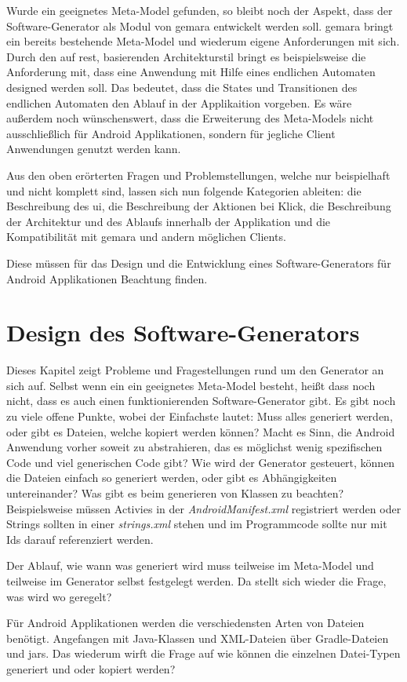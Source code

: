 Wurde ein geeignetes Meta-Model gefunden, so bleibt noch der Aspekt, dass der Software-Generator als Modul von \acf{gemara} entwickelt werden soll. \acs{gemara} bringt ein bereits bestehende Meta-Model und wiederum eigene Anforderungen mit sich. Durch den auf \acf{rest}, basierenden Architekturstil bringt es beispielsweise die Anforderung mit, dass eine Anwendung mit Hilfe eines endlichen Automaten designed werden soll. Das bedeutet, dass die States und Transitionen des endlichen Automaten den Ablauf in der Applikaition vorgeben.
Es wäre außerdem noch wünschenswert, dass die Erweiterung des Meta-Models nicht ausschließlich für Android Applikationen, sondern für jegliche Client Anwendungen genutzt werden kann.

Aus den oben erörterten Fragen und Problemstellungen, welche nur beispielhaft und nicht komplett sind, lassen sich nun folgende Kategorien ableiten: die Beschreibung des \acl{ui}, die Beschreibung der Aktionen bei Klick, die Beschreibung der Architektur und des Ablaufs innerhalb der Applikation und die Kompatibilität mit \acs{gemara} und andern möglichen Clients. 

Diese müssen für das Design und die Entwicklung eines Software-Generators für Android Applikationen Beachtung finden.

\section{Design des Software-Generators}

Dieses Kapitel zeigt Probleme und Fragestellungen rund um den Generator an sich auf. Selbst wenn ein ein geeignetes Meta-Model besteht, heißt dass noch nicht, dass es auch einen funktionierenden Software-Generator gibt. Es gibt noch zu viele offene Punkte, wobei der Einfachste lautet: Muss alles generiert werden, oder gibt es Dateien, welche kopiert werden können? Macht es Sinn, die Android Anwendung vorher soweit zu abstrahieren, das es möglichst wenig spezifischen Code und viel generischen Code gibt? Wie wird der Generator gesteuert, können die Dateien einfach so generiert werden, oder gibt es Abhängigkeiten untereinander? Was gibt es beim generieren von Klassen zu beachten? Beispielsweise müssen Activies in der \textit{AndroidManifest.xml} registriert werden oder Strings sollten in einer \textit{strings.xml} stehen und im Programmcode sollte nur mit Ids darauf referenziert werden.

Der Ablauf, wie wann was generiert wird muss teilweise im Meta-Model und teilweise im Generator selbst festgelegt werden. Da stellt sich wieder die Frage, was wird wo geregelt? 

Für Android Applikationen werden die verschiedensten Arten von Dateien benötigt. Angefangen mit Java-Klassen und XML-Dateien über Gradle-Dateien und \acfp{jar}.
Das wiederum wirft die Frage auf wie können die einzelnen Datei-Typen generiert und oder kopiert werden?
